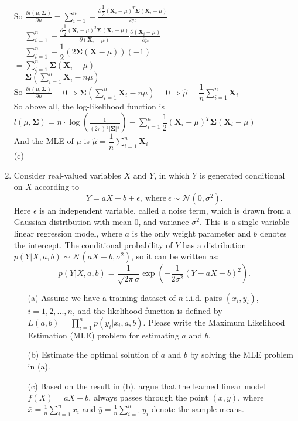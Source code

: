 \documentclass[10pt]{article}
\begin{document}
\begin{enumerate}[1.]
So $\frac{\partial l(\mu,\mathbf{\Sigma})}{\partial \mu}=\sum\limits_{i=1}^n-\frac{\partial \dfrac{1}{2}(\mathbf{X}_i-\mu)^T\mathbf{\Sigma}(\mathbf{X}_i-\mu)}{\partial \mu}$\\
$=\sum_{i=1}^n-\frac{\partial \dfrac{1}{2}(\mathbf{X}_i-\mu)^T\mathbf{\Sigma}(\mathbf{X}_i-\mu)}{\partial (\mathbf{X}_i-\mu)}\frac{\partial (\mathbf{X}_i-\mu)}{\partial \mu}$\\
$=\sum\limits_{i=1}^n-\dfrac{1}{2}(2\mathbf{\Sigma}(\mathbf{X}-\mu))(-1)$\\
$=\sum\limits_{i=1}^n\mathbf{\Sigma}(\mathbf{X}_i-\mu)$\\
$=\mathbf{\Sigma}(\sum\limits_{i=1}^n\mathbf{X}_i-n\mu)$\\

So $\frac{\partial l(\mu,\mathbf{\Sigma})}{\partial \mu}=0\Rightarrow \mathbf{\Sigma}(\sum\limits_{i=1}^n\mathbf{X}_i-n\mu)=0\Rightarrow\hat{\mu}=\dfrac{1}{n}\sum\limits_{i=1}^n\mathbf{X}_i$\\

So above all, the log-likelihood function is $l(\mu,\mathbf{\Sigma})=n\cdot\log(\frac{1}{(2\pi)^\frac{p}{2}|\mathbf{\Sigma}|^{\frac{1}{2}}})-\sum\limits_{i=1}^n\dfrac{1}{2}(\mathbf{X}_i-\mu)^T\mathbf{\Sigma}(\mathbf{X}_i-\mu)$\\
And the MLE of $\mu$ is $\hat{\mu}=\dfrac{1}{n}\sum\limits_{i=1}^n\mathbf{X}_i$\\

(c)



	      \newpage

	\item {} Consider real-valued variables $X$ and $Y$, in which $Y$ is generated conditional on $X$ according to
	$$
	Y = aX + b + \epsilon, \ \text{where} \ \epsilon \sim \mathcal{N}(0, \sigma^2).
	$$
	Here $\epsilon$ is an independent variable, called a noise term, which is drawn from a Gaussian distribution with mean 0,
	and variance $\sigma^2$. This is a single variable linear regression model, where $a$ is the only weight parameter and $b$ denotes the intercept.
	The conditional probability of $Y$ has a distribution $p(Y | X, a, b) \sim \mathcal{N}(aX+b, \sigma^2)$, so it can be written as:
	$$
	p(Y|X, a,b) = \frac{1}{\sqrt{2\pi}\sigma}\exp\left(-\frac{1}{2\sigma^2}(Y - aX -b)^2\right).
	$$
	\begin{itemize}
		\item[(a)] Assume we have a training dataset of $n$ i.i.d. pairs $(x_i, y_i)$, $i = 1, 2, ..., n$, and
		the likelihood function is defined by $L(a,b) = \prod_{i=1}^n p(y_i | x_i, a, b)$. Please write the
		Maximum Likelihood Estimation (MLE) problem for estimating $a$ and $b$.~
		\item[(b)] Estimate the optimal solution of $a$ and $b$ by solving the MLE problem in (a).~
		\item[(c)] Based on the result in (b), argue that the learned linear model $f(X) = aX + b$,
		always passes through the point $(\bar{x},\bar{y})$,
		where $\bar{x} = \tfrac{1}{n}\sum_{i=1}^{n}x_{i}$ and $\bar{y} = \tfrac{1}{n}\sum_{i=1}^{n}y_{i}$ denote the sample means.~
	\end{itemize}



\end{enumerate}
\end{document}
